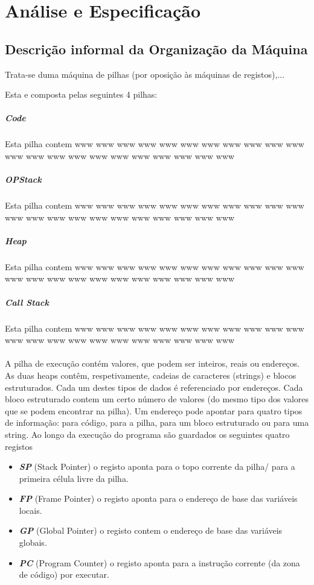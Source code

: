 \documentclass{report}
\begin{document}
\chapter{Análise e Especificação} \label{ae}
\section{Descrição informal da Organização da Máquina}

\quad Trata-se duma máquina de pilhas (por oposição às máquinas de registos),...



Esta e composta pelas seguintes 4 pilhas:
\paragraph{\quad Code}
Esta pilha contem www www www www www www www www www www www www www www www www www www www www www www
\paragraph{\quad OPStack}
Esta pilha contem www www www www www www www www www www www www www www www www www www www www www www
\paragraph{\quad Heap}
Esta pilha contem www www www www www www www www www www www www www www www www www www www www www www
\paragraph{\quad Call Stack}
Esta pilha contem www www www www www www www www www www www www www www www www www www www www www www
\\
\\
\quad A pilha de execução contém valores, que podem ser inteiros, reais ou endereços.
As duas heaps contêm, respetivamente, cadeias de caracteres (strings) e blocos estruturados.
Cada um destes tipos de dados é referenciado por endereços. Cada bloco
estruturado contem um certo número de valores (do mesmo tipo dos valores que se podem
encontrar na pilha).
Um endereço pode apontar para quatro tipos de informação: para código, para a
pilha, para um bloco estruturado ou para uma string.
Ao longo da execução do programa são guardados os seguintes quatro registos
\begin{itemize}
	\item \textit{\textbf{SP}} (Stack Pointer) o registo aponta para o topo corrente da pilha/ para a primeira célula livre da pilha.
	\item \textit{\textbf{FP}} (Frame Pointer) o registo aponta para o endereço de base das variáveis locais.
	\item \textit{\textbf{GP}} (Global Pointer) o registo contem o endereço de base das variáveis globais.
	\item \textit{\textbf{PC}} (Program Counter) o registo aponta para a instrução corrente (da zona de código) por executar.
\end{itemize}
\end{document}
